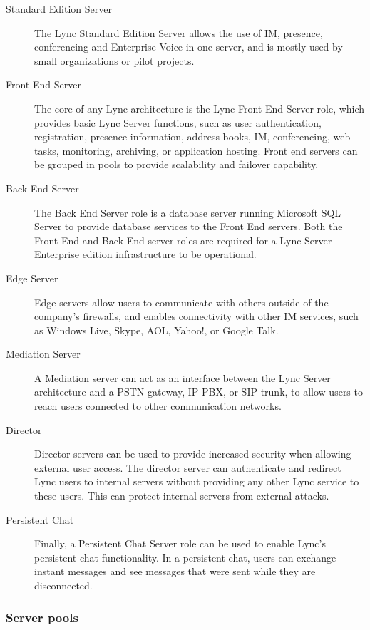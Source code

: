 \begin{description}
\item[Standard Edition Server] The Lync Standard Edition Server allows the use of IM, presence, conferencing and Enterprise Voice in one server, and is mostly used by small organizations or pilot projects.

\item[Front End Server] The core of any Lync architecture is the Lync Front End Server role, which provides basic Lync Server functions, such as user authentication, registration, presence information, address books, IM, conferencing, web tasks, monitoring, archiving, or application hosting. Front end servers can be grouped in pools to provide scalability and failover capability.

\item[Back End Server] The Back End Server role is a database server running Microsoft SQL Server to provide database services to the Front End servers. Both the Front End and Back End server roles are required for a Lync Server Enterprise edition infrastructure to be operational.

\item[Edge Server] Edge servers allow users to communicate with others outside of the company's firewalls, and enables connectivity with other IM services, such as Windows Live, Skype, AOL, Yahoo!, or Google Talk.

\item[Mediation Server] A Mediation server can act as an interface between the Lync Server architecture and a PSTN gateway, IP-PBX, or SIP trunk, to allow users to reach users connected to other communication networks.

\item[Director] Director servers can be used to provide increased security when allowing external user access. The director server can authenticate and redirect Lync users to internal servers without providing any other Lync service to these users. This can protect internal servers from external attacks.

\item[Persistent Chat] Finally, a Persistent Chat Server role can be used to enable Lync's persistent chat functionality. In a persistent chat, users can exchange instant messages and see messages that were sent while they are disconnected.
\end{description}



\subsubsection{Server pools}


